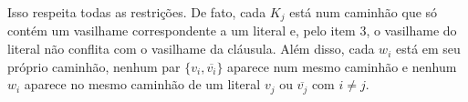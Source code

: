 \documentclass[11pt]{article}
\begin{document}
\begin{enumerate}
Isso respeita todas as restrições. De fato, cada $K_j$ está num
caminhão que só contém um vasilhame correspondente a um literal e,
pelo item 3, o vasilhame do literal não conflita com o vasilhame da
cláusula. Além disso, cada $w_i$ está em seu próprio caminhão, nenhum
par $\{v_i, \overline{v_i}\}$ aparece num mesmo caminhão e nenhum
$w_i$ aparece no mesmo caminhão de um literal $v_j$ ou
$\overline{v_j}$ com $i \neq j$.
\end{enumerate}
\end{document}

